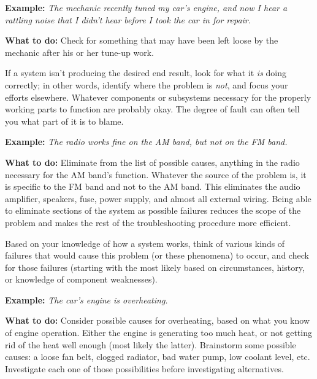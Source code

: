 {\bf Example:} {\em The mechanic recently tuned my car's engine, and now
I hear a rattling noise that I didn't hear before I took the car in for
repair.}

{\bf What to do:} Check for something that may have been left loose by
the mechanic after his or her tune-up work.

\stopsubsection

\startsubsection[title={Function
vs.~Non-Function},reference={xtocid15790975}]

If a system isn't producing the desired end result, look for what it
{\em is} doing correctly; in other words, identify where the problem is
{\em not}, and focus your efforts elsewhere. Whatever components or
subsystems necessary for the properly working parts to function are
probably okay. The degree of fault can often tell you what part of it is
to blame.

{\bf Example:} {\em The radio works fine on the AM band, but not on the
FM band.}

{\bf What to do:} Eliminate from the list of possible causes, anything
in the radio necessary for the AM band's function. Whatever the source
of the problem is, it is specific to the FM band and not to the AM band.
This eliminates the audio amplifier, speakers, fuse, power supply, and
almost all external wiring. Being able to eliminate sections of the
system as possible failures reduces the scope of the problem and makes
the rest of the troubleshooting procedure more efficient.

\stopsubsection

\startsubsection[title={Hypothesize},reference={sec:xtocid15790976}]

Based on your knowledge of how a system works, think of various kinds of
failures that would cause this problem (or these phenomena) to occur,
and check for those failures (starting with the most likely based on
circumstances, history, or knowledge of component weaknesses).

{\bf Example:} {\em The car's engine is overheating.}

{\bf What to do:} Consider possible causes for overheating, based on
what you know of engine operation. Either the engine is generating too
much heat, or not getting rid of the heat well enough (most likely the
latter). Brainstorm some possible causes: a loose fan belt, clogged
radiator, bad water pump, low coolant level, etc. Investigate each one
of those possibilities before investigating alternatives.

